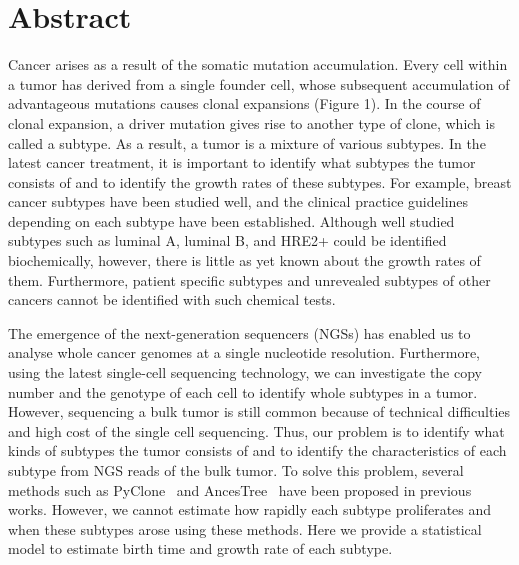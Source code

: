 \documentclass{article}
\begin{document}
\section*{Abstract}
Cancer arises as a result of the somatic mutation accumulation. Every cell within a tumor has derived from a single founder cell, whose subsequent accumulation of advantageous mutations causes clonal expansions (Figure 1). In the course of clonal expansion, a driver mutation gives rise to another type of clone, which is called a subtype. As a result, a tumor is a mixture of various subtypes. In the latest cancer treatment, it is important to identify what subtypes the tumor consists of and to identify the growth rates of these subtypes. For example, breast cancer subtypes have been studied well, and the clinical practice guidelines depending on each subtype have been established. Although well studied subtypes such as luminal A, luminal B, and HRE2+ could be identified biochemically, however, there is little as yet known about the growth rates of them. Furthermore, patient specific subtypes and unrevealed subtypes of other cancers cannot be identified with such chemical tests.

The emergence of the next-generation sequencers (NGSs) has enabled us to analyse whole cancer genomes at a single nucleotide resolution. Furthermore, using the latest single-cell sequencing technology, we can investigate the copy number and the genotype of each cell to identify whole subtypes in a tumor. However, sequencing a bulk tumor is still common because of technical difficulties and high cost of the single cell sequencing. Thus, our problem is to identify what kinds of subtypes the tumor consists of and to identify the characteristics of each subtype from NGS reads of the bulk tumor. To solve this problem, several methods such as PyClone~\cite{roth2014pyclone} and AncesTree~\cite{el2015reconstruction} have been proposed in previous works. However, we cannot estimate how rapidly each subtype proliferates and when these subtypes arose using these methods. Here we provide a statistical model to estimate birth time and growth rate of each subtype.
\end{document}
